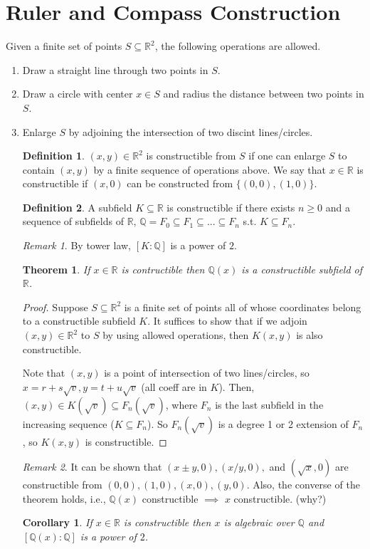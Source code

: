 \documentclass{article}
\theoremstyle{definition}
\newtheorem*{defn*}{Definition}
\theoremstyle{remark}
\newtheorem{rem}{Remark}
\theoremstyle{plain}
\newtheorem{thm}[defn]{Theorem}
\newtheorem{crly}[defn]{Corollary}
\newcommand{\QQ}{\mathbb{Q}}
\newcommand{\RR}{\mathbb{R}}
\begin{document}
\section{Ruler and Compass Construction}
Given a finite set of points $S\subseteq\RR^2$, the following operations are allowed.
\begin{enumerate}
    \item Draw a straight line through two points in $S$.
    \item Draw a circle with center $x\in S$ and radius the distance between two points in $S$.
    \item Enlarge $S$ by adjoining the intersection of two discint lines/circles.
\begin{defn*}
    $(x,y)\in\RR^2$ is constructible from $S$ if one can enlarge $S$ to contain $(x,y)$ by a finite sequence of operations above. We say that $x\in\RR$ is constructible if $(x,0)$ can be constructed from $\{(0,0),(1,0)\}$.
\end{defn*}
\begin{defn*}
    A subfield $K\subseteq\RR$ is constructible if there exists $n\ge 0$ and a sequence of subfields of $\RR$, $\QQ=F_0\subseteq F_1\subseteq...\subseteq F_n$ s.t. $K\subseteq F_n$.
\end{defn*}
\begin{rem}
    By tower law, $[K:\QQ]$ is a power of $2$.
\end{rem}
\begin{thm}
    If $x\in\RR$ is contructible then $\QQ(x)$ is a constructible subfield of $\RR$.
\end{thm}
\begin{proof}
    Suppose $S\subseteq\RR^2$ is a finite set of points all of whose coordinates belong to a constructible subfield $K$. It suffices to show that if we adjoin $(x,y)\in\RR^2$ to $S$ by using allowed operations, then $K(x,y)$ is also constructible.

    Note that $(x,y)$ is a point of intersection of two lines/circles, so $x=r+s\sqrt{v}, y=t+u\sqrt{v}$ (all coeff are in $K$). Then, $(x,y)\in K(\sqrt{v})\subseteq F_n(\sqrt{v})$, where $F_n$ is the last subfield in the increasing sequence ($K\subseteq F_n$). So $F_n(\sqrt{v})$ is a degree 1 or 2 extension of $F_n$, so $K(x,y)$ is constructible.
\end{proof}
\begin{rem}
    It can be shown that $(x\pm y,0), (x/y,0),$ and $(\sqrt{x},0)$ are constructible from $(0,0),(1,0),(x,0),(y,0)$. Also, the converse of the theorem holds, i.e., $\QQ(x)$ constructible  $\implies$ $x$ constructible. (why?)
\end{rem}
\begin{crly}
    If $x\in\RR$ is constructible then $x$ is algebraic over $\QQ$ and $[\QQ(x):\QQ]$ is a power of $2$.
\end{crly}


\end{enumerate}
\end{document}
